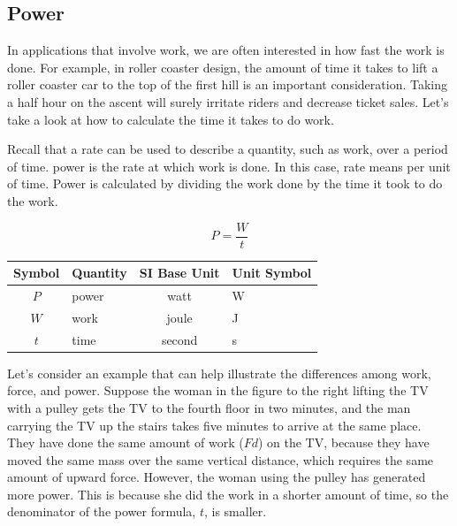 \documentclass{article}
\numberwithin{equation}{section}
\numberwithin{figure}{section}
\begin{document}
\cyanhrule

\clearpage
\subsection{Power} \label{bxZysw}

In applications that involve work, we are often interested in how fast the work is done. For example, in roller coaster design, the amount of time it takes to lift a roller coaster car to the top of the first hill is an important consideration. Taking a half hour on the ascent will surely irritate riders and decrease ticket sales. Let's take a look at how to calculate the time it takes to do work.
\vspace{1em}

Recall that a rate can be used to describe a quantity, such as work, over a period of time. \Gls{power} is the rate at which work is done. In this case, rate means per unit of time. Power is calculated by dividing the work done by the time it took to do the work.

\begin{equation} \label{k6uV1p}
    P = \frac{W}{t}
\end{equation}

\begin{center}
    \begin{tabular}{cl|cl}
    \hline
    \textbf{Symbol} & \textbf{Quantity} & \textbf{SI Base Unit} & \textbf{Unit Symbol}  \\
    \hline\hline
    \rule{0pt}{2.5ex}
        $P$ & power & watt & W\\
        $W$ & work & joule & J\\
        $t$ & time & second & s\\
    \hline
    \end{tabular}
\end{center}


Let's consider an example that can help illustrate the differences among work, force, and power. Suppose the woman in the figure to the right lifting the TV with a pulley gets the TV to the fourth floor in two minutes, and the man carrying the TV up the stairs takes five minutes to arrive at the same place. They have done the same amount of work ($F d$) on the TV, because they have moved the same mass over the same vertical distance, which requires the same amount of upward force. However, the woman using the pulley has generated more power. This is because she did the work in a shorter amount of time, so the denominator of the power formula, $t$, is smaller.
\end{document}

